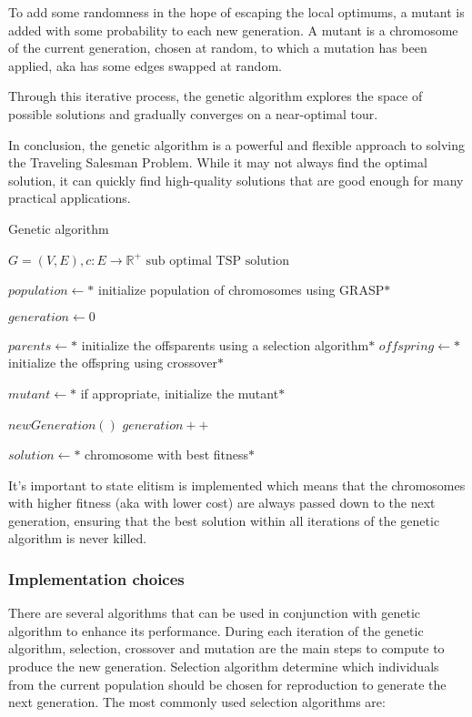 To add some randomness in the hope of escaping the local optimums, a mutant is added with some probability to each new generation. A mutant is a chromosome of the current generation, chosen at random, to which a mutation has been applied, aka has some edges swapped at random.

Through this iterative process, the genetic algorithm explores the space of possible solutions and gradually converges on a near-optimal tour.

In conclusion, the genetic algorithm is a powerful and flexible approach to solving the Traveling Salesman Problem. While it may not always find the optimal solution, it can quickly find high-quality solutions that are good enough for many practical applications.

\begin{algorithm}
    \caption{Genetic algorithm}\label{algo:genetic}
    \begin{algorithmic}[1]
    \Require $G = (V,E), c:E \to \mathbb{R}^+$
    \Ensure $\text{sub optimal TSP solution}$
    
    \State $population \gets *$ initialize population of chromosomes using GRASP$*$

    \State $ generation \gets 0$


        \State $parents \gets *$ initialize the offsparents  using a selection algorithm$*$
        \State $offspring \gets *$ initialize the offspring using crossover$*$

        \State $mutant \gets *$ if appropriate, initialize the mutant$*$

        \State $ newGeneration() $
        \State $ generation++ $

    \EndWhile

    \State $ solution \gets *$ chromosome with best fitness$*$

    

    \end{algorithmic}
\end{algorithm}

It's important to state elitism is implemented which means that the chromosomes with higher fitness (aka with lower cost) are always passed down to the next generation, ensuring that the best solution within all iterations of the genetic algorithm is never killed. 

\subsubsection{Implementation choices}
There are several algorithms that can be used in conjunction with genetic algorithm to enhance its performance.
During each iteration of the genetic algorithm, selection, crossover and mutation are the main steps to compute to produce the new generation.
Selection algorithm determine which individuals from the current population should be chosen for reproduction to generate the next generation. The most commonly used selection algorithms are:

